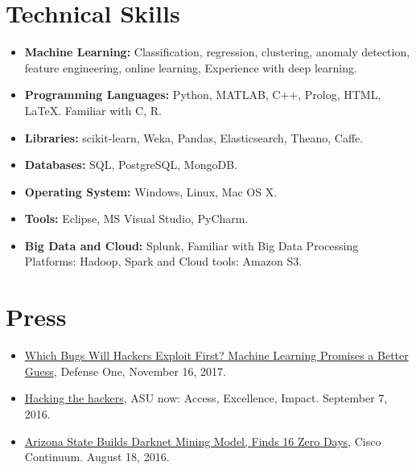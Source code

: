 \documentclass[margin,line]{CV}
\begin{document}
\begin{resume}
\section{\sc Technical Skills} 
\begin{itemize}[leftmargin =*]

\item {\bf Machine Learning:} Classification, regression, clustering, anomaly detection, feature engineering, online learning, Experience with deep learning.

\item{\bf Programming Languages:} Python, MATLAB, C++, Prolog, HTML, LaTeX. Familiar with C, R. 

\item{\bf Libraries:} scikit-learn, Weka, Pandas, Elasticsearch, Theano, Caffe. 

\item {\bf Databases:} SQL, PostgreSQL, MongoDB.

\item {\bf Operating System:} Windows, Linux, Mac OS X. 

\item {\bf Tools:} Eclipse, MS Visual Studio, PyCharm. 

\item {\bf Big Data and Cloud:} Splunk, Familiar with Big Data Processing Platforms: Hadoop, Spark and Cloud tools: Amazon S3. 

\end{itemize}


\section{\sc Press}
\begin{itemize}[leftmargin=*]
	
\item 
\href{http://www.defenseone.com/technology/2017/11/which-bugs-will-hackers-exploit-first-machine-learning-promises-better-guess/142621/?oref=d-channeltop}{Which Bugs Will Hackers Exploit First? Machine Learning Promises a Better Guess}, Defense One, November 16, 2017.

\item \href{https://asunow.asu.edu/20160907-solutions-asu-researchers-hacking-hackers-new-approach}{Hacking the hackers}, ASU now: Access, Excellence, Impact. September 7, 2016.

\item \href{https://continuum.cisco.com/2016/08/18/arizona-state-builds-darknet-mining-model-finds-16-zero-days/}{Arizona State Builds Darknet Mining Model, Finds 16 Zero Days}, Cisco Continuum. August 18, 2016.


\end{itemize}
\end{resume}
\end{document}

